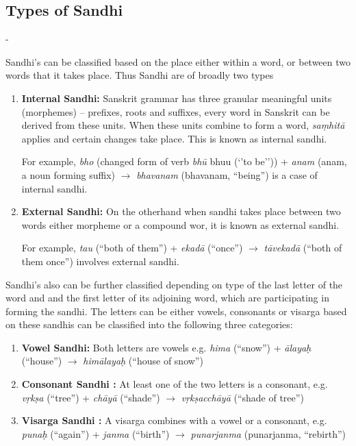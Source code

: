 \documentclass[11pt]{article}
\begin{document}
\subsection{Types of Sandhi} - 

Sandhi's can be classified based on the place either within a word, or between two words that it takes place. Thus Sandhi are of broadly two types
\begin{enumerate}
\item \textbf{Internal Sandhi:} Sanskrit grammar has three granular meaningful units (morphemes) – prefixes, roots and suffixes, every word in Sanskrit can be derived from these units. When these units combine to form a word, \textit{sa\d{m}hit\={a}} applies and certain changes take place. This is known as internal sandhi.

For example, \textit{ bho} (changed form of verb \textit{bh\={u}} bhuu (‘’to be’’)) + \textit{anam} (anam, a noun forming suffix) $\rightarrow$ \textit{bhavanam }(bhavanam, “being”) is a case of internal sandhi.

\item \textbf{External Sandhi:}
On the otherhand when sandhi takes place between two words either morpheme or a compound wor, it is known as external sandhi. 

For example,
\textit{tau} (``both of them'') + \textit{ekad\={a}} (``once'') $\rightarrow$ \textit{t\={a}vekad\={a}} (``both of them once'') involves external sandhi.

\end{enumerate}

Sandhi's also can be further classified depending on type of the last letter of the word and and the first letter of its adjoining word, which are participating in forming the sandhi. The letters can be  either vowels, consonants or visarga based on these sandhis can be classified into the following three categories:

\begin{enumerate}
\item \textbf{Vowel Sandhi:} Both letters are vowels e.g. \textit{ hima} (``snow'') + \textit{ \={a}laya\d{h}} (``house'') $\rightarrow$ \textit{him\={a}laya\d{h}} (``house of snow'')
\item \textbf{Consonant Sandhi :}  At least one of the two letters is a consonant, e.g. \textit{v\d{r}k\d{s}a} (``tree'') + \textit{ch\={a}y\={a} }(``shade'') $\rightarrow$ \textit{v\d{r}k\d{s}acch\={a}y\={a}} (``shade of tree'') 
\item \textbf{Visarga Sandhi :} A visarga combines with a vowel or a consonant, e.g.  \textit{ puna\d{h} }(``again'') + \textit{janma }(``birth'') $\rightarrow$ \textit{punarjanma} (punarjanma, “rebirth”)

\end{enumerate}
\end{document}
